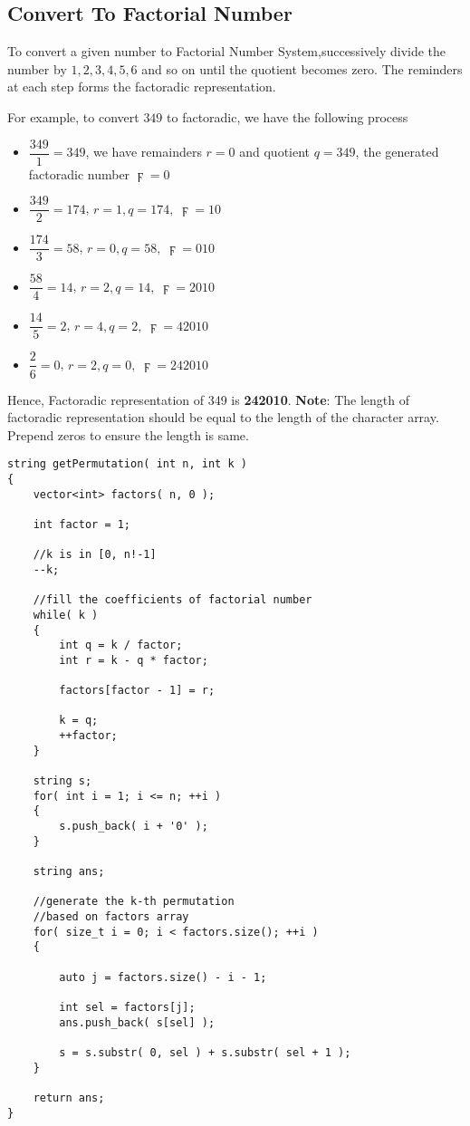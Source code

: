\subsection{Convert To Factorial Number}
To convert a given number to Factorial Number System,successively divide the number by $1,2,3,4,5,6$ and so on until the quotient becomes zero. The reminders at each step forms the factoradic representation.
\par
For example, to convert $349$ to factoradic, we have the following process
\begin{itemize}
    \item $\dfrac{349}{1} = 349$, we have remainders $r = 0$ and quotient $q = 349$, the generated factoradic number $\digamma = 0$
    \item $\dfrac{349}{2} = 174$, $r = 1, q = 174,\; \digamma = 10$
    \item $\dfrac{174}{3} = 58$, $r = 0, q = 58,\; \digamma = 010$
    \item $\dfrac{58}{4} = 14$, $r = 2, q = 14,\; \digamma = 2010$
    \item $\dfrac{14}{5} = 2$, $r = 4, q = 2,\; \digamma = 42010$
    \item $\dfrac{2}{6} = 0$, $r = 2, q = 0,\; \digamma = 242010$
\end{itemize}
Hence, Factoradic representation of 349 is \textbf{242010}. \textbf{Note}: The length of factoradic representation should be equal to the length of the character array. Prepend zeros to ensure the length is same.

\setcounter{lstlisting}{0}
\begin{lstlisting}[style=customc, caption={Factorial Number System}]
string getPermutation( int n, int k )
{
    vector<int> factors( n, 0 );

    int factor = 1;

    //k is in [0, n!-1]
    --k;

    //fill the coefficients of factorial number
    while( k )
    {
        int q = k / factor;
        int r = k - q * factor;

        factors[factor - 1] = r;

        k = q;
        ++factor;
    }

    string s;
    for( int i = 1; i <= n; ++i )
    {
        s.push_back( i + '0' );
    }

    string ans;

    //generate the k-th permutation
    //based on factors array
    for( size_t i = 0; i < factors.size(); ++i )
    {

        auto j = factors.size() - i - 1;

        int sel = factors[j];
        ans.push_back( s[sel] );

        s = s.substr( 0, sel ) + s.substr( sel + 1 );
    }

    return ans;
}
\end{lstlisting}